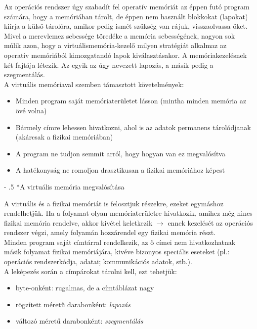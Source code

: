 \documentclass[tikz,12pt,margin=0px]{article}
\makeatletter
\renewcommand\paragraph{%
	\@startsection{paragraph}{4}{0mm}%
	{-\baselineskip}%
	{.5\baselineskip}%
	{\normalfont\normalsize\bfseries}}
\makeatother
\begin{document}
    \noindent Az operációs rendszer úgy szabadít fel operatív memóriát az éppen futó program számára, hogy a memóriában tárolt, de éppen nem használt blokkokat (lapokat) kiírja a külső tárolóra, amikor pedig ismét szükség van rájuk, visszaolvassa őket. Mivel a merevlemez sebessége töredéke a memória sebességének, nagyon sok múlik azon, hogy a virtuálismemória-kezelő milyen stratégiát alkalmaz az operatív memóriából kimozgatandó lapok kiválasztásakor. A memóriakezelésnek két fajtája létezik. Az egyik az úgy nevezett lapozás, a másik pedig a szegmentálás.\\
\newpage
    \noindent A virtuális memóriaval szemben támasztott követelmények:
    \begin{itemize}[topsep=8pt,itemsep=4pt,partopsep=4pt, parsep=4pt]
        \item Minden program saját memóriaterületet lásson (mintha minden memória az övé volna)
        \item Bármely címre lehessen hivatkozni, ahol is az adatok permanens tárolódjanak (akárcsak a fizikai memóriában)
        \item A program ne tudjon semmit arról, hogy hogyan van ez megvalósítva
        \item A hatékonyság ne romoljon drasztikusan a fizikai memóriához képest\\
    \end{itemize}

    \paragraph*{A virtuális memória megvalósítása}

    \noindent A virtuális és a fizikai memóriát is felosztjuk részekre, ezeket egymáshoz rendelhetjük. Ha a folyamat olyan memóriaterületre hivatkozik, amihez még nincs fizikai memória rendelve, akkor kivétel keletkezik $\rightarrow$ ennek kezelését az operációs rendszer végzi, amely folyamán hozzárendel egy fizikai memória részt.\\

    \noindent Minden program saját címtárral rendelkezik, az ő címei nem hivatkozhatnak másik folyamat fizikai memóriájára, kivéve bizonyos speciális eseteket (pl.: operációs rendszerkódja,   adatai;   kommunikációs   adatok,   stb.). \\

    \noindent A leképezés  során a címpárokat tárolni kell, ezt tehetjük:
    \begin{itemize}[topsep=8pt,itemsep=4pt,partopsep=4pt, parsep=4pt]
        \item byte-onként: rugalmas, de a címtáblázat nagy
        \item rögzített méretű darabonként: \emph{lapozás}
        \item változó méretű darabonként: \emph{szegmentálás}
    \end{itemize}
\end{document}
